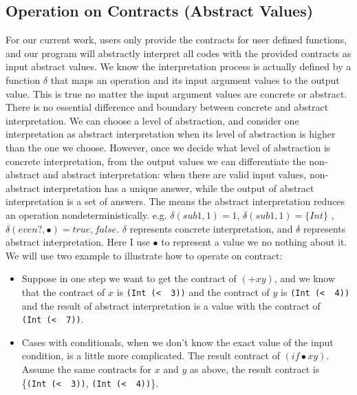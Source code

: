 \documentclass[paper=a4, fontsize=11pt]{scrartcl} %
\numberwithin{equation}{section} %
\numberwithin{figure}{section} %
\numberwithin{table}{section} %
\begin{document}
\subsection{Operation on Contracts (Abstract Values)}
For our current work, users only provide the contracts for user defined functions, and our program will abstractly interpret all codes with the provided contracts as input abstract values.
We know the interpretation process is actually defined by a function $\delta$ that maps an operation and its input argument values to the output value. This is true no matter the input argument values are concrete or abstract. There is no essential difference and boundary between concrete and abstract interpretation. We can choose a level of abstraction, and consider one interpretation as abstract interpretation when its level of abstraction is higher than the one we choose. However, once we decide what level of abstraction is concrete interpretation, from the output values we can differentiate the non-abstract and abstract interpretation: when there are valid input values, non-abstract interpretation has a unique answer, while the output of abstract interpretation is a set of answers. The means the abstract interpretation reduces an operation nondeterministically. e.g. $\delta(sub1, 1) = 1$, $\delta\hat{}(sub1, 1) = \{Int\}$ , $\delta\hat{}(even?, \bullet) = {true, false}$. $\delta$ represents concrete interpretation, and $\delta\hat{}$ represents abstract interpretation. Here I use $\bullet$ to represent a value we no nothing about it.
We will use two example to illustrate how to operate on contract:
\begin{itemize}
\item Suppose in one step we want to get the contract of $(+ x y)$, and we know that the contract of $x$ is \texttt{(Int\ (\textless\ \underscore\ 3))} and the contract of $y$ is \texttt{(Int\ (\textless\ \underscore\ 4))} and the result of abstract interpretation is a value with the contract of \texttt{(Int\ (\textless\ \underscore\ 7))}.

\item Cases with conditionals, when we don't know the exact value of the input condition, is a little more complicated. The result contract of $(if \bullet x y)$. Assume the same contracts for $x$ and $y$ as above, the result contract is \{\texttt{(Int\ (\textless\ \underscore\ 3))}, \texttt{(Int\ (\textless\ \underscore\ 4))}\}.

\end{itemize}
 
\end{document}
